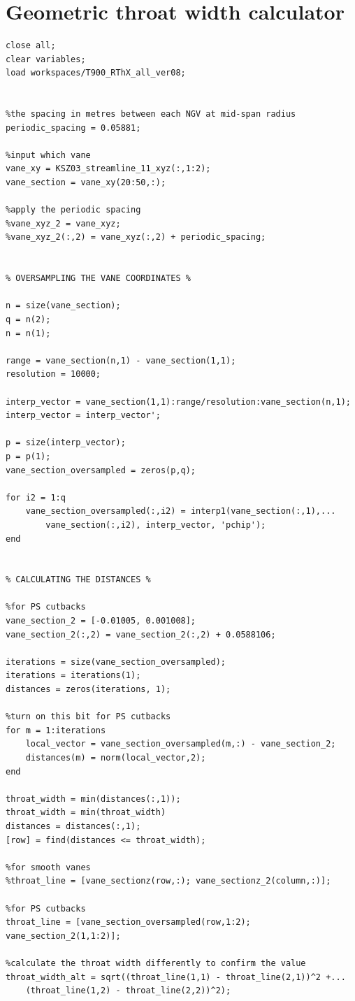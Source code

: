 \documentclass[a4paper, 11pt, oneside]{report}
\begin{document}
\section{Geometric throat width calculator}
\begin{verbatim}
close all;
clear variables;
load workspaces/T900_RThX_all_ver08;


%the spacing in metres between each NGV at mid-span radius
periodic_spacing = 0.05881; 

%input which vane
vane_xy = KSZ03_streamline_11_xyz(:,1:2);
vane_section = vane_xy(20:50,:);

%apply the periodic spacing
%vane_xyz_2 = vane_xyz;
%vane_xyz_2(:,2) = vane_xyz(:,2) + periodic_spacing;


% OVERSAMPLING THE VANE COORDINATES %

n = size(vane_section);
q = n(2);
n = n(1);

range = vane_section(n,1) - vane_section(1,1);
resolution = 10000;
    
interp_vector = vane_section(1,1):range/resolution:vane_section(n,1);
interp_vector = interp_vector';

p = size(interp_vector);
p = p(1);
vane_section_oversampled = zeros(p,q);

for i2 = 1:q
    vane_section_oversampled(:,i2) = interp1(vane_section(:,1),...
        vane_section(:,i2), interp_vector, 'pchip');
end 


% CALCULATING THE DISTANCES %

%for PS cutbacks
vane_section_2 = [-0.01005, 0.001008];
vane_section_2(:,2) = vane_section_2(:,2) + 0.0588106;

iterations = size(vane_section_oversampled);
iterations = iterations(1);
distances = zeros(iterations, 1);

%turn on this bit for PS cutbacks
for m = 1:iterations
    local_vector = vane_section_oversampled(m,:) - vane_section_2;
    distances(m) = norm(local_vector,2);
end

throat_width = min(distances(:,1));
throat_width = min(throat_width)
distances = distances(:,1);
[row] = find(distances <= throat_width);

%for smooth vanes
%throat_line = [vane_sectionz(row,:); vane_sectionz_2(column,:)];

%for PS cutbacks
throat_line = [vane_section_oversampled(row,1:2); vane_section_2(1,1:2)];

%calculate the throat width differently to confirm the value
throat_width_alt = sqrt((throat_line(1,1) - throat_line(2,1))^2 +...
    (throat_line(1,2) - throat_line(2,2))^2);



\end{verbatim}
\end{document}
